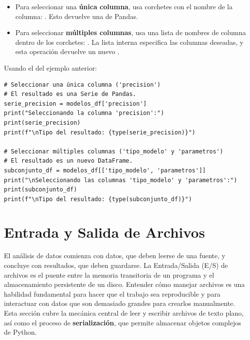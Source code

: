 \begin{itemize}
    \item Para seleccionar una \textbf{única columna}, usa corchetes con el nombre de la columna: . Esto devuelve una  de Pandas.
    \item Para seleccionar \textbf{múltiples columnas}, usa una lista de nombres de columna dentro de los corchetes: . La lista interna especifica las columnas deseadas, y esta operación devuelve un nuevo .
\end{itemize}

\begin{example}
Usando el  del ejemplo anterior:
\text{ }\begin{verbatim}
# Seleccionar una única columna ('precision')
# El resultado es una Serie de Pandas.
serie_precision = modelos_df['precision']
print("Seleccionando la columna 'precision':")
print(serie_precision)
print(f"\nTipo del resultado: {type(serie_precision)}")

# Seleccionar múltiples columnas ('tipo_modelo' y 'parametros')
# El resultado es un nuevo DataFrame.
subconjunto_df = modelos_df[['tipo_modelo', 'parametros']]
print("\nSeleccionando las columnas 'tipo_modelo' y 'parametros':")
print(subconjunto_df)
print(f"\nTipo del resultado: {type(subconjunto_df)}")
\end{verbatim}
\end{example}

\section{Entrada y Salida de Archivos}
\label{sec:file_io}
El análisis de datos comienza con datos, que deben leerse de una fuente, y concluye con resultados, que deben guardarse. La Entrada/Salida (E/S) de archivos es el puente entre la memoria transitoria de un programa y el almacenamiento persistente de un disco. Entender cómo manejar archivos es una habilidad fundamental para hacer que el trabajo sea reproducible y para interactuar con datos que son demasiado grandes para crearlos manualmente. Esta sección cubre la mecánica central de leer y escribir archivos de texto plano, así como el proceso de \textbf{serialización}, que permite almacenar objetos complejos de Python.

